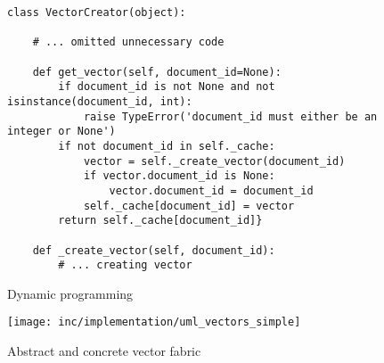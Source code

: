 \begin{figure}[h]
    \lstset{language=Python}
    \begin{lstlisting}
class VectorCreator(object):
    
    # ... omitted unnecessary code

    def get_vector(self, document_id=None):
        if document_id is not None and not isinstance(document_id, int):
            raise TypeError('document_id must either be an integer or None')
        if not document_id in self._cache:
            vector = self._create_vector(document_id)
            if vector.document_id is None:
                vector.document_id = document_id
            self._cache[document_id] = vector
        return self._cache[document_id]}

    def _create_vector(self, document_id):
        # ... creating vector
    \end{lstlisting}
    \caption{Dynamic programming}
    \label{fig:dynamic-programming}
\end{figure}


\begin{figure}[h]
    \center
    \texttt{[image: inc/implementation/uml\_vectors\_simple]}
    \caption{Abstract and concrete vector fabric}
    \label{fig:uml-vectorssimple}
\end{figure}

